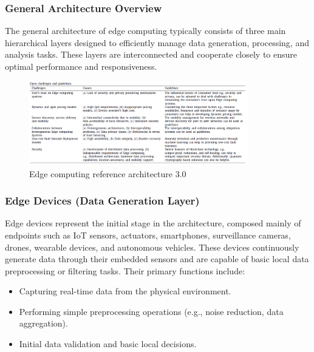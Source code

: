 \documentclass[runningheads]{llncs}
\begin{document}
\subsubsection{General Architecture Overview}
The general architecture of edge computing typically consists of three main hierarchical layers designed to efficiently manage data generation, processing, and analysis tasks. These layers are interconnected and cooperate closely to ensure optimal performance and responsiveness.

\begin{figure}[ht]
    \centering
    \includegraphics[width=0.85\textwidth]{IMG/3.png}
    \caption{Edge computing reference architecture 3.0}
    \label{fig:edge_reference_architecture}
    \end{figure}


\subsubsection{Edge Devices (Data Generation Layer)}
Edge devices represent the initial stage in the architecture, composed mainly of endpoints such as IoT sensors, actuators, smartphones, surveillance cameras, drones, wearable devices, and autonomous vehicles. These devices continuously generate data through their embedded sensors and are capable of basic local data preprocessing or filtering tasks. Their primary functions include:
\begin{itemize}
    \item Capturing real-time data from the physical environment.
    \item Performing simple preprocessing operations (e.g., noise reduction, data aggregation).
    \item Initial data validation and basic local decisions.
\end{itemize}
\end{document}
